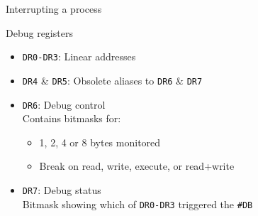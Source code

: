 \documentclass{beamer} %
\begin{document}
\begin{frame}{Interrupting a process}



\end{frame}

\begin{frame}{Debug registers}
\begin{itemize}
    \item<1-> \texttt{DR0-DR3}: Linear addresses
    \item<2-> \texttt{DR4} \& \texttt{DR5}: Obsolete aliases to \texttt{DR6} \& \texttt{DR7}
    \item<3-> \texttt{DR6}: Debug control\\
        Contains bitmasks for:
        \begin{itemize}
            \item 1, 2, 4 or 8 bytes monitored
            \item Break on read, write, execute, or read+write
        \end{itemize}
    \item<4-> \texttt{DR7}: Debug status \\
        Bitmask showing which of \texttt{DR0-DR3} triggered the \texttt{\#DB}
\end{itemize}
\end{frame}
\end{document}
